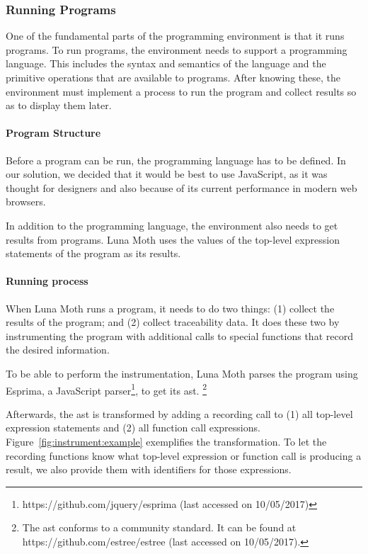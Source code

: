 \subsubsection{Running Programs}
One of the fundamental parts of the programming environment is that it runs programs.
To run programs, the environment needs to support a programming language.
This includes the syntax and semantics of the language and the primitive operations that are available to programs.
After knowing these, the environment must implement a process to run the program and collect results so as to display them later.


\paragraph{Program Structure}
Before a program can be run, the programming language has to be defined.
In our solution, we decided that it would be best to use JavaScript, as it was thought for designers and also because of its current performance in modern web browsers.

In addition to the programming language, the environment also needs to get results from programs.
Luna Moth uses the values of the top-level expression statements of the program as its results.


\paragraph{Running process}
When Luna Moth runs a program, it needs to do two things: (1) collect the results of the program; and (2) collect traceability data.
It does these two by instrumenting the program with additional calls to special functions that record the desired information.

To be able to perform the instrumentation, Luna Moth parses the program using Esprima, a JavaScript parser\footnote{https://github.com/jquery/esprima (last accessed on 10/05/2017)}, to get its \gls{ast}.%
\footnote{The \gls{ast} conforms to a community standard. It can be found at https://github.com/estree/estree (last accessed on 10/05/2017).}

Afterwards, the \gls{ast} is transformed by adding a recording call to (1) all top-level expression statements and (2) all function call expressions.
Figure~\ref{fig:instrument:example} exemplifies the transformation.
To let the recording functions know what top-level expression or function call is producing a result, we also provide them with identifiers for those expressions.

